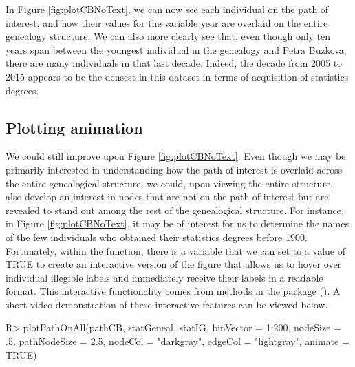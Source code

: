 \documentclass[article,shortnames]{jss}
\begin{document}
In Figure \ref{fig:plotCBNoText}, we can now see each individual on the path of interest, and how their values for the variable year are overlaid on the entire genealogy structure. We can also more clearly see that, even though only ten years span between the youngest individual in the genealogy and Petra Buzkova, there are many individuals in that last decade. Indeed, the decade from 2005 to 2015 appears to be the densest in this dataset in terms of acquisition of statistics degrees.

\subsection{Plotting animation}
\label{interaction}

We could still improve upon Figure \ref{fig:plotCBNoText}. Even though we may be primarily interested in understanding how the path of interest is overlaid across the entire genealogical structure, we could, upon viewing the entire structure, also develop an interest in nodes that are not on the path of interest but are revealed to stand out among the rest of the genealogical structure. For instance, in Figure \ref{fig:plotCBNoText}, it may be of interest for us to determine the names of the few individuals who obtained their statistics degrees before 1900. Fortunately, within the  function, there is a variable  that we can set to a value of TRUE to create an interactive version of the figure that allows us to hover over individual illegible labels and immediately receive their labels in a readable format. This interactive functionality comes from methods in the  package (\citealt{plotly}). A short video demonstration of these interactive features can be viewed below. 

\begin{CodeChunk}
\begin{CodeInput}
R> plotPathOnAll(pathCB, statGeneal, statIG, binVector = 1:200, nodeSize = .5,
   pathNodeSize = 2.5, nodeCol = "darkgray", edgeCol = "lightgray", animate =
   TRUE)
\end{CodeInput}
\end{CodeChunk}
\end{document}
